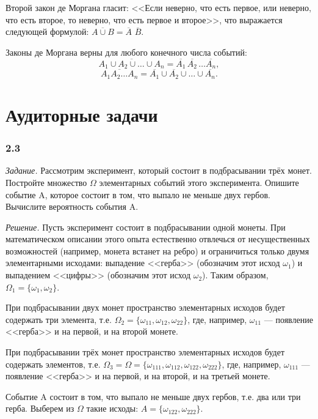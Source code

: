 \documentclass{book}
\begin{document}
Второй закон де Моргана гласит: <<Если неверно, что есть первое, или неверно, что есть второе, то неверно, что есть первое и второе>>, что выражается следующей формулой: $\overline{A\cup B}=\overline{A}$ $\overline{B}$.

Законы де Моргана верны для любого конечного числа событий: $$\overline{A_1\cup A_2\cup \dotsc \cup A_n}=\overline{A_1}\,\overline{A_2}\, \dotsc \overline{A_n},$$ $$\overline{A_1A_2 \dotsc A_n}=\overline{A_1}\cup\overline{A_2}\cup \dotsc \cup\overline{A_n}.$$

\section*{Аудиторные задачи}

\subsubsection*{2.3}

\textit{Задание.} Рассмотрим эксперимент, который состоит в подбрасывании трёх монет. Постройте множество $\Omega$ элементарных событий этого эксперимента. Опишите событие A, которое состоит в том, что выпало не меньше двух гербов. Вычислите вероятность события A.

\textit{Решение.} Пусть эксперимент состоит в подбрасывании одной монеты. При математическом описании этого опыта естественно отвлечься от несущественных возможностей (например, монета встанет на ребро) и ограничиться только двумя элементарными исходами: выпадение <<герба>> (обозначим этот исход $\omega_1$) и выпадением <<цифры>> (обозначим этот исход $\omega_2$). Таким образом, $\Omega_1=\{\omega_1, \omega_2\}$.

При подбрасывании двух монет пространство элементарных исходов будет содержать три элемента, т.е. $\Omega_2=\{\omega_{11}, \omega_{12}, \omega_{22}\}$, где, например, $\omega_{11}$ --- появление <<герба>> и на первой, и на второй монете.

При подбрасывании трёх монет пространство элементарных исходов будет содержать элементов, т.е. $\Omega_3=\Omega=\{\omega_{111}, \omega_{112}, \omega_{122}, \omega_{222}\}$, где, например, $\omega_{111}$ --- появление <<герба>> и на первой, и на второй, и на третьей монете.

Событие A состоит в том, что выпало не меньше двух гербов, т.е. два или три герба. Выберем из $\Omega$ такие исходы: $A=\{\omega_{122}, \omega_{222}\}$.
\end{document}
